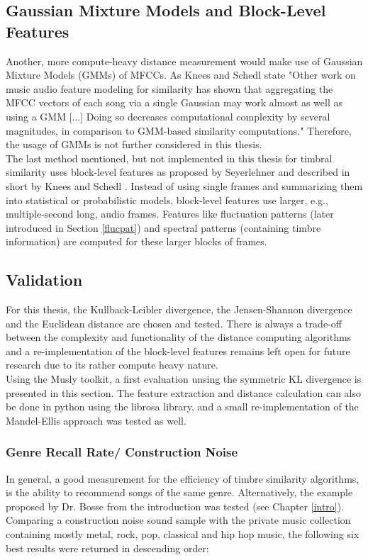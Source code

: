 \subsection{Gaussian Mixture Models and Block-Level Features}\label{blocklevel}
Another, more compute-heavy distance measurement would make use of Gaussian Mixture Models (GMMs) of MFCCs. As Knees and Schedl state "Other work on music audio feature modeling for similarity has shown that aggregating the MFCC vectors of each song via a single Gaussian may work almost as well as using a GMM [...] Doing so decreases computational complexity by several magnitudes, in comparison to GMM-based similarity computations." \cite[p. 65]{knees1} Therefore, the usage of GMMs is not further considered in this thesis.\\
The last method mentioned, but not implemented in this thesis for timbral similarity uses block-level features as proposed by Seyerlehner \cite{seyerlehnerblock} and described in short by Knees and Schedl \cite[p. 67]{knees1}. Instead of using single frames and summarizing them into statistical or probabilistic models, block-level features use larger, e.g., multiple-second long, audio frames. Features like fluctuation patterns (later introduced in Section \ref{flucpat}) and spectral patterns (containing timbre information) are computed for these larger blocks of frames. 

\subsection{Validation}

For this thesis, the Kullback-Leibler divergence, the Jensen-Shannon divergence and the Euclidean distance are chosen and tested. There is always a trade-off between the complexity and functionality of the distance computing algorithms and a re-implementation of the block-level features remains left open for future research due to its rather compute heavy nature.\\
Using the Musly toolkit, a first evaluation unsing the symmetric KL divergence is presented in this section. The feature extraction and distance calculation can also be done in python using the librosa library, and a small re-implementation of the Mandel-Ellis approach was tested as well.\\

\subsubsection{Genre Recall Rate/ Construction Noise}
In general, a good measurement for the efficiency of timbre similarity algorithms, is the ability to recommend songs of the same genre. 
Alternatively, the example proposed by Dr. Bosse from the introduction was tested (see Chapter \ref{intro}). Comparing a construction noise sound sample with the private music collection containing mostly metal, rock, pop, classical and hip hop music, the following six best results were returned in descending order: 

